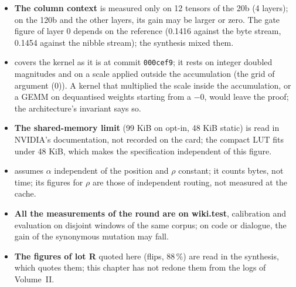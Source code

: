 \begin{faux}
\begin{itemize}
\item \textbf{The column context} is measured only on 12 tensors of the 20b (4 layers); on the 120b and the other layers, its gain may be larger or zero. The gate figure of layer 0 depends on the reference (0.1416 against the byte stream, 0.1454 against the nibble stream); the synthesis mixed them.
\item \textbf{} covers the kernel as it is at commit \texttt{000cef9}; it rests on integer doubled magnitudes and on a scale applied outside the accumulation (the grid of argument (0)). A kernel that multiplied the scale inside the accumulation, or a GEMM on dequantised weights starting from a $-0$, would leave the proof; the architecture's invariant says so.
\item \textbf{The shared-memory limit} (99 KiB on opt-in, 48 KiB static) is read in NVIDIA's documentation, not recorded on the card; the compact LUT fits under 48 KiB, which makes the specification independent of this figure.
\item \textbf{} assumes $\alpha$ independent of the position and $\rho$ constant; it counts bytes, not time; its figures for $\rho$ are those of independent routing, not measured at the cache.
\item \textbf{All the measurements of the round are on wiki.test}, calibration and evaluation on disjoint windows of the same corpus; on code or dialogue, the gain of the synonymous mutation may fall.
\item \textbf{The figures of lot R} quoted here (flips, 88\,\%) are read in the synthesis, which quotes them; this chapter has not redone them from the logs of Volume~II.
\end{itemize}
\end{faux}

